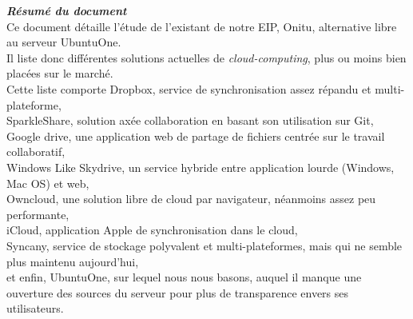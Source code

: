 \thispagestyle{empty}
\vspace*{10mm}

\textbf{\emph{\textcolor{epiBlue}{Résumé du document} } }\\

Ce document détaille l'étude de l'existant de notre EIP, Onitu, alternative libre au serveur UbuntuOne.\\
Il liste donc différentes solutions actuelles de \emph{cloud-computing}, plus ou moins bien placées sur le marché.\\
Cette liste comporte Dropbox, service de synchronisation assez répandu et multi-plateforme,\\
SparkleShare, solution axée collaboration en basant son utilisation sur Git,\\
Google drive, une application web de partage de fichiers centrée sur le travail collaboratif,\\
Windows Like Skydrive, un service hybride entre application lourde (Windows, Mac OS) et web,\\
Owncloud, une solution libre de cloud par navigateur, néanmoins assez peu performante,\\
iCloud, application Apple de synchronisation dans le cloud,\\
Syncany, service de stockage polyvalent et multi-plateformes, mais qui ne semble plus maintenu aujourd'hui,\\
et enfin, UbuntuOne, sur lequel nous nous basons, auquel il manque une ouverture des sources du serveur pour plus de transparence envers ses utilisateurs.

\newpage